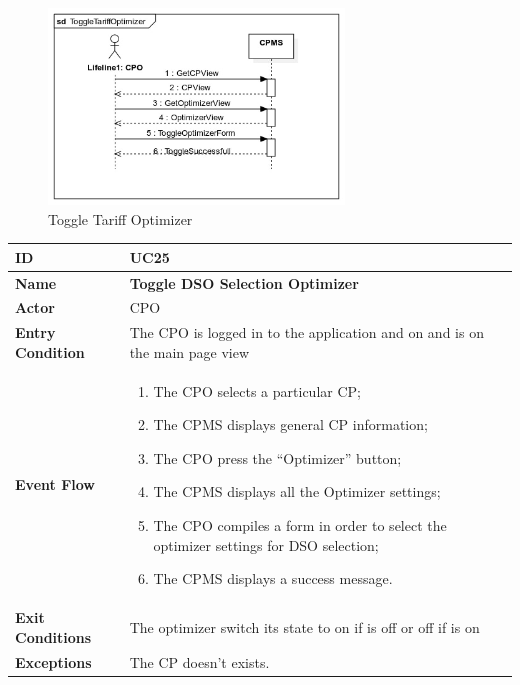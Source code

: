 \documentclass{Configuration_Files/PoliMi3i_thesis}
\begin{document}
\begin{figure}[H]
    \centering
    \includegraphics[width=0.7\textwidth]{Images/UseCases/ToggleTariffOptimizer.jpg}
    \caption{Toggle Tariff Optimizer}
\end{figure}


\begin{table}[H]
    \begin{xltabular}{\textwidth}{| >{}l | X |}
    \hline
    \textbf{ID} & \textbf{UC25}\T\B\\
    \hline
    \textbf{Name} & \textbf{Toggle DSO Selection Optimizer}\T\B\\
    \hline \hline
    \textbf{Actor} & CPO\T\B \\
    \hline
    \textbf{Entry Condition} & The CPO is logged in to the application and on and is on the main page view\T\B\\
    \hline
    \textbf{Event Flow} & 
        \begin{enumerate}
        \item The CPO selects a particular CP;
        \item The CPMS displays general CP information;
        \item The CPO press the “Optimizer” button;
        \item The CPMS displays all the Optimizer settings;
        \item The CPO compiles a form in order to select the optimizer settings for DSO selection;
        \item The CPMS displays a success message.
        \end{enumerate}\B\\
    \hline
    \textbf{Exit Conditions} & The optimizer switch its state to on if is off or off if is on\B\\
    \hline
    \textbf{Exceptions} & 
        The CP doesn't exists.\B\\
    \hline
    \end{xltabular}
\end{table}
\end{document}
